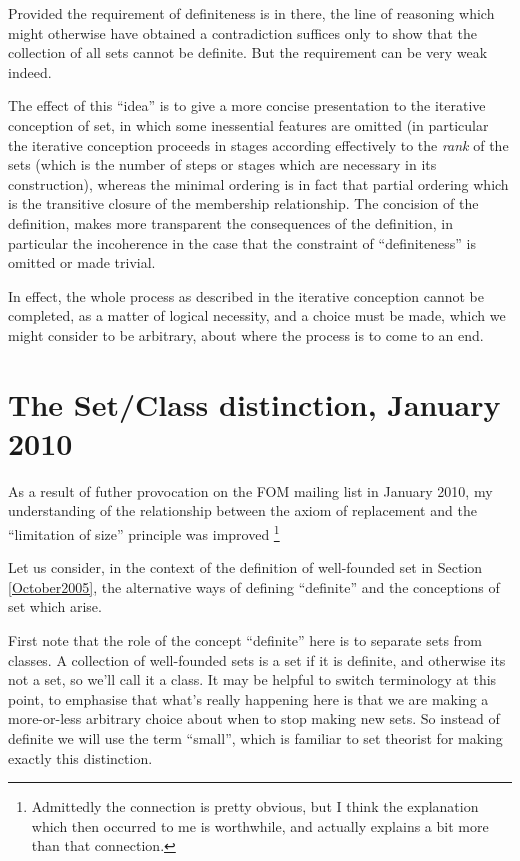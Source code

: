 Provided the requirement of definiteness is in there, the line of reasoning which might otherwise have obtained a contradiction suffices only to show that the collection of all sets cannot be definite.
But the requirement can be very weak indeed.

The effect of this ``idea'' is to give a more concise presentation to the iterative conception of set, in which some inessential features are omitted (in particular the iterative conception proceeds in stages according effectively to the {\it rank} of the sets (which is the number of steps or stages which are necessary in its construction), whereas the minimal ordering is in fact that partial ordering which is the transitive closure of the membership relationship.
The concision of the definition, makes more transparent the consequences of the definition, in particular the incoherence in the case that the constraint of ``definiteness'' is omitted or made trivial.

In effect, the whole process as described in the iterative conception cannot be completed, as a matter of logical necessity, and a choice must be made, which we might consider to be arbitrary, about where the process is to come to an end.

\section{The Set/Class distinction, January 2010}

As a result of futher provocation on the FOM mailing list in January 2010, my understanding of the relationship between the axiom of replacement and the ``limitation of size'' principle was improved
\footnote{Admittedly the connection is pretty obvious, but I think the explanation which then occurred to me is worthwhile, and actually explains a bit more than that connection.}%

Let us consider, in the context of the definition of well-founded set in Section \ref{October2005}, the alternative ways of defining ``definite'' and the conceptions of set which arise.

First note that the role of the concept ``definite'' here is to separate sets from classes.
A collection of well-founded sets is a set if it is definite, and otherwise its not a set, so we'll call it a class.
It may be helpful to switch terminology at this point, to emphasise that what's really happening here is that we are making a more-or-less arbitrary choice about when to stop making new sets.
So instead of definite we will use the term ``small'', which is familiar to set theorist for making exactly this distinction.

